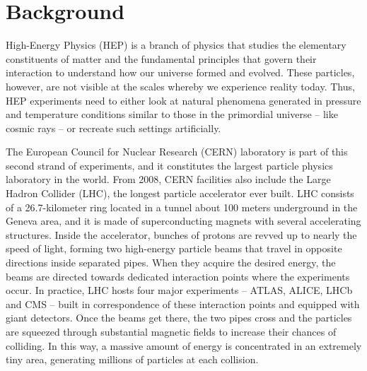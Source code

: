 \section{Background}



High-Energy Physics (HEP) is a branch of physics that studies the elementary constituents of matter and the fundamental principles that govern their interaction to understand how our universe formed and evolved.  
These particles, however, are not visible at the scales whereby we experience reality today. 
Thus, HEP experiments need to either look at natural phenomena generated in pressure and temperature conditions similar to those in the primordial universe -- like cosmic rays -- or recreate such settings artificially.

The European Council for Nuclear Research (CERN) laboratory is part of this second strand of experiments, and it constitutes the largest particle physics laboratory in the world.
From 2008, CERN facilities also include the Large Hadron Collider (LHC), the longest particle accelerator ever built.
LHC consists of a 26.7-kilometer ring located in a tunnel about 100 meters underground in the Geneva area, and it is made of superconducting magnets with several accelerating structures.
Inside the accelerator, bunches of protons are revved up to nearly the speed of light, forming two high-energy particle beams that travel in opposite directions inside separated pipes. 
When they acquire the desired energy, the beams are directed towards dedicated interaction points where the experiments occur.%
In practice, LHC hosts four major experiments -- ATLAS, ALICE, LHCb and CMS -- built in correspondence of these interaction points and equipped with giant detectors.
Once the beams get there, the two pipes cross and the particles are squeezed through substantial magnetic fields to increase their chances of colliding. 
In this way, a massive amount of energy is concentrated in an extremely tiny area, generating millions of particles at each collision.

